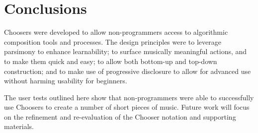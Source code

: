 \documentclass{ppig}
\begin{document}
\hypertarget{conclusions}{%
\section{Conclusions}\label{conclusions}}

Choosers were developed to allow non-programmers access to algorithmic
composition tools and processes. The design principles were to leverage
parsimony to enhance learnability; to surface musically meaningful
actions, and to make them quick and easy; to allow both bottom-up and
top-down construction; and to make use of progressive disclosure to
allow for advanced use without harming usability for beginners.

The user tests outlined here show that non-programmers were able to
successfully use Choosers to create a number of short pieces of music.
Future work will focus on the refinement and re-evaluation of the
Chooser notation and supporting materials.


 
\end{document}
